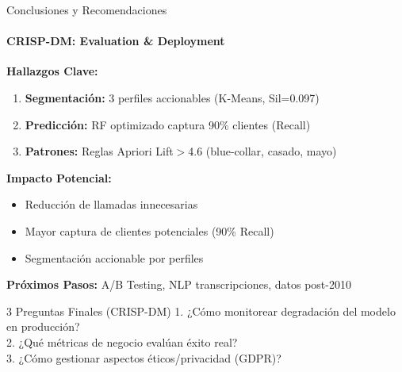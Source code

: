 \documentclass[10pt]{beamer}
\begin{document}
\begin{frame}{Conclusiones y Recomendaciones}
\framesubtitle{CRISP-DM: Evaluation \& Deployment}

\textbf{Hallazgos Clave:}
\begin{enumerate}
    \item \textcolor{mGreen}{\textbf{Segmentación:}} 3 perfiles accionables (K-Means, Sil=0.097)
    \item \textcolor{mGreen}{\textbf{Predicción:}} RF optimizado captura 90\% clientes (Recall)
    \item \textcolor{mGreen}{\textbf{Patrones:}} Reglas Apriori Lift$>$4.6 (blue-collar, casado, mayo)
\end{enumerate}

\vspace{0.2cm}
\textbf{Impacto Potencial:}
\begin{itemize}
    \item \textcolor{mGreen}{Reducción de llamadas innecesarias}
    \item \textcolor{mGreen}{Mayor captura de clientes potenciales (90\% Recall)}
    \item \textcolor{mGreen}{Segmentación accionable por perfiles}
\end{itemize}

\vspace{0.2cm}
\textbf{Próximos Pasos:} A/B Testing, NLP transcripciones, datos post-2010

\vspace{0.2cm}
\begin{alertblock}{3 Preguntas Finales (CRISP-DM)}
\small
1. ¿Cómo monitorear degradación del modelo en producción?\\
2. ¿Qué métricas de negocio evalúan éxito real?\\
3. ¿Cómo gestionar aspectos éticos/privacidad (GDPR)?
\end{alertblock}
\end{frame}
\end{document}
